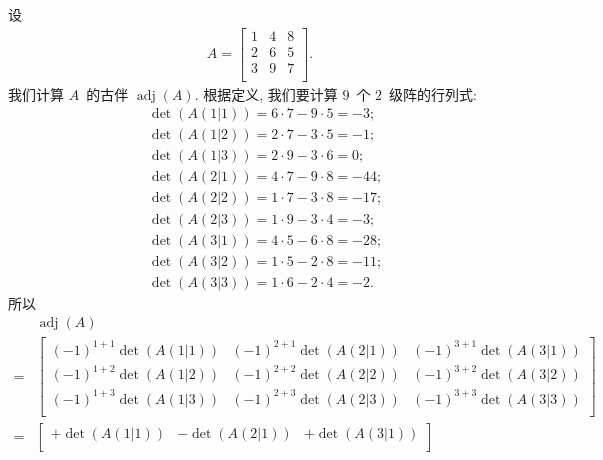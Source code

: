 \documentclass[../libro.tex]{subfiles}
\begin{document}
\begin{example}
    设
    \begin{align*}
        A =
        \begin{bmatrix}
            1 & 4 & 8 \\
            2 & 6 & 5 \\
            3 & 9 & 7 \\
        \end{bmatrix}.
    \end{align*}
    我们计算 \(A\)~的古伴 \(\operatorname{adj} {(A)}\).
    根据定义, 我们要计算 \(9\)~个 \(2\)~级阵的行列式:
    \begin{align*}
        & \det {(A(1|1))} = 6 \cdot 7 - 9 \cdot 5 = -3;  \\
        & \det {(A(1|2))} = 2 \cdot 7 - 3 \cdot 5 = -1;  \\
        & \det {(A(1|3))} = 2 \cdot 9 - 3 \cdot 6 = 0;   \\
        & \det {(A(2|1))} = 4 \cdot 7 - 9 \cdot 8 = -44; \\
        & \det {(A(2|2))} = 1 \cdot 7 - 3 \cdot 8 = -17; \\
        & \det {(A(2|3))} = 1 \cdot 9 - 3 \cdot 4 = -3;  \\
        & \det {(A(3|1))} = 4 \cdot 5 - 6 \cdot 8 = -28; \\
        & \det {(A(3|2))} = 1 \cdot 5 - 2 \cdot 8 = -11; \\
        & \det {(A(3|3))} = 1 \cdot 6 - 2 \cdot 4 = -2.
    \end{align*}
    所以
    \begin{align*}
        & \operatorname{adj} {(A)}
        \\
        = {} &
        \begin{bmatrix}
            (-1)^{1+1} \det {(A(1|1))}
            & (-1)^{2+1} \det {(A(2|1))}
            & (-1)^{3+1} \det {(A(3|1))} \\
            (-1)^{1+2} \det {(A(1|2))}
            & (-1)^{2+2} \det {(A(2|2))}
            & (-1)^{3+2} \det {(A(3|2))} \\
            (-1)^{1+3} \det {(A(1|3))}
            & (-1)^{2+3} \det {(A(2|3))}
            & (-1)^{3+3} \det {(A(3|3))} \\
        \end{bmatrix}
        \\
        = {} &
        \begin{bmatrix}
            +\det {(A(1|1))}
            & -\det {(A(2|1))}
            & +\det {(A(3|1))} \\

\end{bmatrix}
\end{align*}
\end{example}
\end{document}
